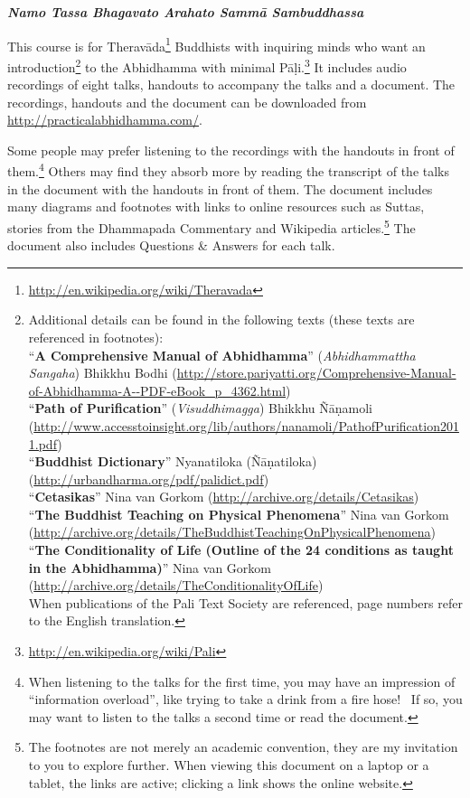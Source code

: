 \begin{center}
\textbf{\textit{Namo Tassa Bhagavato Arahato Sammā Sambuddhassa}} \\
\end{center}

This course is for Theravāda\footnote{\url{http://en.wikipedia.org/wiki/Theravada}} Buddhists with inquiring minds who want an introduction\footnote{Additional details can be found in the following texts (these texts are referenced in footnotes):\\
“\textbf{A Comprehensive Manual of Abhidhamma}” (\textit{Abhidhammattha Sangaha}) Bhikkhu Bodhi (\url{http://store.pariyatti.org/Comprehensive-Manual-of-Abhidhamma-A--PDF-eBook_p_4362.html})\\
“\textbf{Path of Purification}” (\textit{Visuddhimagga}) Bhikkhu Ñāṇamoli (\url{http://www.accesstoinsight.org/lib/authors/nanamoli/PathofPurification2011.pdf})\\
“\textbf{Buddhist Dictionary}” Nyanatiloka (Ñāṇatiloka) (\url{http://urbandharma.org/pdf/palidict.pdf})\\
“\textbf{Cetasikas}” Nina van Gorkom (\url{http://archive.org/details/Cetasikas})\\
“\textbf{The Buddhist Teaching on Physical Phenomena}” Nina van Gorkom (\url{http://archive.org/details/TheBuddhistTeachingOnPhysicalPhenomena})\\
“\textbf{The Conditionality of Life (Outline of the 24 conditions as taught in the Abhidhamma)}” Nina van Gorkom (\url{http://archive.org/details/TheConditionalityOfLife})\\
When publications of the Pali Text Society are referenced, page numbers refer to the English translation.} to the Abhidhamma with minimal Pāḷi.\footnote{\url{http://en.wikipedia.org/wiki/Pali}} It includes audio recordings of eight talks, handouts to accompany the talks and a document. The recordings, handouts and the document can be downloaded from \url{http://practicalabhidhamma.com/}.

Some people may prefer listening to the recordings with the handouts in front of them.\footnote{When listening to the talks for the first time, you may have an impression of “information overload”, like trying to take a drink from a fire hose! \smiley \ If so, you may want to listen to the talks a second time or read the document.} Others may find they absorb more by reading the transcript of the talks in the document with the handouts in front of them. The document includes many diagrams and footnotes with links to online resources such as Suttas, stories from the Dhammapada Commentary and Wikipedia articles.\footnote{The footnotes are not merely an academic convention, they are my invitation to you to explore further. When viewing this document on a laptop or a tablet, the links are active; clicking a link shows the online website.} The document also includes Questions \& Answers for each talk. 

